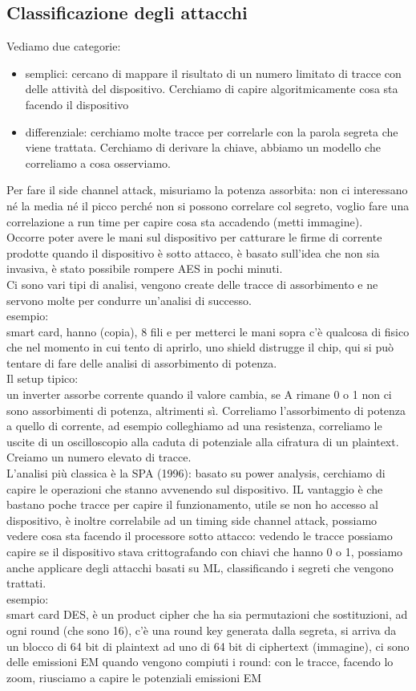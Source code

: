 \documentclass[oneside, 12pt]{extbook}
\begin{document}
\subsection{Classificazione degli attacchi} 
Vediamo due categorie:
\begin{itemize}
	\item semplici: cercano di mappare il risultato di un numero limitato di tracce con delle attività del dispositivo. Cerchiamo di capire algoritmicamente cosa sta facendo il dispositivo
	\item differenziale: cerchiamo molte tracce per correlarle con la parola segreta che viene trattata. Cerchiamo di derivare la chiave, abbiamo un modello che correliamo a cosa osserviamo.
\end{itemize}
Per fare il side channel attack, misuriamo la potenza assorbita: non ci interessano né la media né il picco perché non si possono correlare col segreto, voglio fare una correlazione a run time per capire cosa sta accadendo (metti immagine).\\Occorre poter avere le mani sul dispositivo per catturare le firme di corrente prodotte quando il dispositivo è sotto attacco, è basato sull'idea che non sia invasiva, è stato possibile rompere AES in pochi minuti.\\Ci sono vari tipi di analisi, vengono create delle tracce di assorbimento e ne servono molte per condurre un'analisi di successo.\\esempio:\\smart card, hanno (copia), 8 fili e per metterci le mani sopra c'è qualcosa di fisico che nel momento in cui tento di aprirlo, uno shield distrugge il chip, qui si può tentare di fare delle analisi di assorbimento di potenza.\\Il setup tipico:\\un inverter assorbe corrente quando il valore cambia, se A rimane 0 o 1 non ci sono assorbimenti di potenza, altrimenti sì. Correliamo l'assorbimento di potenza a quello di corrente, ad esempio colleghiamo ad una resistenza, correliamo le uscite di un oscilloscopio alla caduta di potenziale alla cifratura di un plaintext. Creiamo un numero elevato di tracce.\\L'analisi più classica è la SPA (1996): basato su power analysis, cerchiamo di capire le operazioni che stanno avvenendo sul dispositivo. IL vantaggio è che bastano poche tracce per capire il funzionamento, utile se non ho accesso al dispositivo, è inoltre correlabile ad un timing side channel attack, possiamo vedere cosa sta facendo il processore sotto attacco: vedendo le tracce possiamo capire se il dispositivo stava crittografando con chiavi che hanno 0 o 1, possiamo anche applicare degli attacchi basati su ML, classificando i segreti che vengono trattati.\\esempio:\\smart card DES, è un product cipher che ha sia permutazioni che sostituzioni, ad ogni round (che sono 16), c'è una round key generata dalla segreta, si arriva da un blocco di 64 bit di plaintext ad uno di 64 bit di ciphertext (immagine), ci sono delle emissioni EM quando vengono compiuti i round: con le tracce, facendo lo zoom, riusciamo a capire le potenziali emissioni EM 
\end{document}

